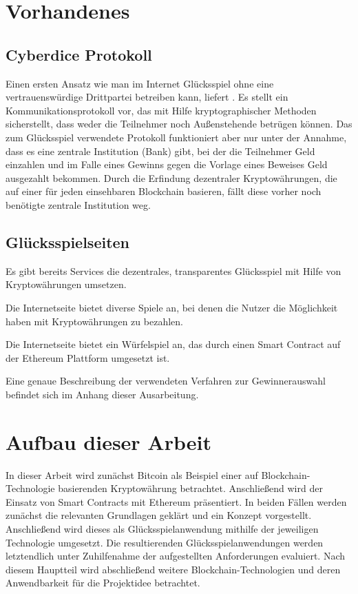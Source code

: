 \section{Vorhandenes}

\subsection{Cyberdice Protokoll}

Einen ersten Ansatz wie man im Internet Glücksspiel ohne eine vertrauenswürdige Drittpartei betreiben kann, liefert \cite{cyberdice_paper}. Es stellt ein Kommunikationsprotokoll vor, das mit Hilfe kryptographischer Methoden sicherstellt, dass weder die Teilnehmer noch Außenstehende betrügen können. Das zum Glücksspiel verwendete Protokoll funktioniert aber nur unter der Annahme, dass es eine zentrale Institution (Bank) gibt, bei der die Teilnehmer Geld einzahlen und im Falle eines Gewinns gegen die Vorlage eines Beweises Geld ausgezahlt bekommen. Durch die Erfindung dezentraler Kryptowährungen, die auf einer für jeden einsehbaren Blockchain basieren, fällt diese vorher noch benötigte zentrale Institution weg.


\subsection{Glücksspielseiten}
Es gibt bereits Services die dezentrales, transparentes Glücksspiel mit Hilfe von Kryptowährungen umsetzen.

Die Internetseite \cite{crypto_games} bietet diverse Spiele an, bei denen die Nutzer die Möglichkeit haben mit Kryptowährungen zu bezahlen.

Die Internetseite \cite{vdice} bietet ein Würfelspiel an, das durch einen Smart Contract auf der Ethereum Plattform umgesetzt ist.

Eine genaue Beschreibung der verwendeten Verfahren zur Gewinnerauswahl befindet sich im Anhang dieser Ausarbeitung.

\section{Aufbau dieser Arbeit}
In dieser Arbeit wird zunächst Bitcoin als Beispiel einer auf Blockchain-Technologie basierenden Kryptowährung betrachtet. Anschließend wird der Einsatz von Smart Contracts mit Ethereum präsentiert. In beiden Fällen werden zunächst die relevanten Grundlagen geklärt und ein Konzept vorgestellt. Anschließend wird dieses als Glücksspielanwendung mithilfe der jeweiligen Technologie umgesetzt. Die resultierenden Glücksspielanwendungen werden letztendlich unter Zuhilfenahme der aufgestellten Anforderungen evaluiert. Nach diesem Hauptteil wird abschließend weitere Blockchain-Technologien und deren Anwendbarkeit für die Projektidee betrachtet.